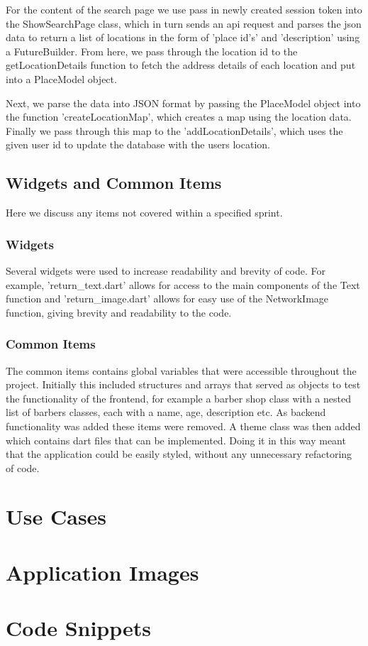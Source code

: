 \documentclass[12pt]{article}
\begin{document}
	For the content of the search page we use pass in newly created session token into the ShowSearchPage class, which in turn sends an api request and parses the json data to return a list of locations in the form of 'place id's' and 'description' using a FutureBuilder. From here, we pass through the location id to the getLocationDetails function to fetch the address details of each location and put into a PlaceModel object.
	
	Next, we parse the data into JSON format by passing the PlaceModel object into the function 'createLocationMap', which creates a map using the location data. Finally we pass through this map to the 'addLocationDetails', which uses the given user id to update the database with the users location.
	
	\subsection{Widgets and Common Items}
	Here we discuss any items not covered within a specified sprint.
	
	\subsubsection{Widgets}
	Several widgets were used to increase readability and brevity of code. For example, 'return\_text.dart' allows for access to the main components of the Text function and 'return\_image.dart' allows for easy use of the NetworkImage function, giving brevity and readability to the code.
	
	\subsubsection{Common Items}
	The common items contains global variables that were accessible throughout the project. Initially this included structures and arrays that served as objects to test the functionality of the frontend, for example a barber shop class with a nested list of barbers classes, each with a name, age, description etc. As backend functionality was added these items were removed. A theme class was then added which contains dart files that can be implemented. Doing it in this way meant that the application could be easily styled, without any unnecessary refactoring of code.
	
	
	
	\appendix
	\section{Use Cases}
	\section{Application Images}
	\section{Code Snippets}
	
\end{document}
